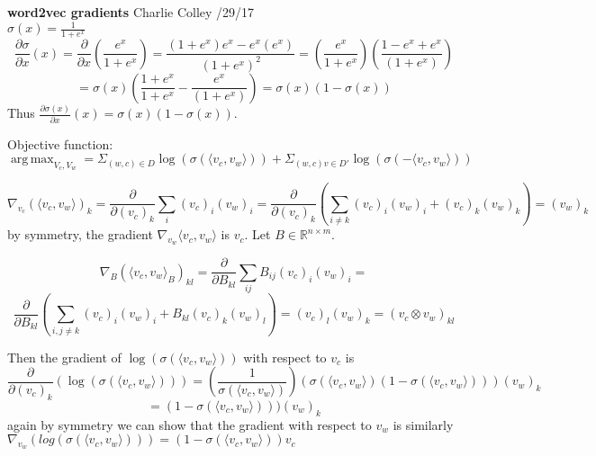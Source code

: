 \documentclass{report}
\DeclareMathOperator*{\argmax}{arg\,max}
\begin{document}
   \textbf{word2vec gradients} \quad Charlie Colley /29/17\\
   
     
   $ \sigma(x) = \frac{1}{1 + e^{x}} $
   \[\frac{\partial \sigma}{\partial x}(x) 
     =  \frac{\partial}{\partial x}(\frac{e^x}{1+e^x}) 
     =  \frac{(1 + e^x)e^x - e^x(e^x)}{(1 + e^x)^2} 
     = (\frac{e^x}{1+ e^x})(\frac{1 - e^x + e^x}{(1 + e^x)}) \]
     \[
     = \sigma(x)(\frac{1+e^x}{1+e^x} -\frac{e^x}{(1+e^x)})
     = \sigma(x)(1 - \sigma(x))
   \]
   Thus  $\frac{\partial \sigma(x)}{\partial x}(x) =
           \sigma(x)(1 - \sigma(x))$.
           
\vspace{10 mm}
   Objective function:\\
   $ \displaystyle\argmax_{V_c, V_w} 
     = \displaystyle\Sigma_{(w,c) \in D} 
     \log(\sigma(\langle v_c, v_w\rangle)) +\displaystyle\Sigma_{(w,c)v\in D'} 
         \log(\sigma(-\langle v_c, v_w \rangle)) $

   \[
      \nabla_{v_c} (\langle v_c, v_w \rangle)_k = \frac{\partial}{\partial (v_c)_k}\displaystyle \sum_{i}(v_c)_i(v_w)_i = \frac{\partial}{\partial (v_c)_k}(\displaystyle \sum_{i \neq k}(v_c)_i(v_w)_i + (v_c)_k(v_w)_k) = (v_w)_k
   \]
   by symmetry, the gradient $\nabla_{v_w} \langle v_c, v_w \rangle $ is $ v_c $.
   Let $ B \in \mathbb{R}^{n \times m}$.
     
    \[ \nabla_{B} (\langle v_c, v_w \rangle_{B})_{kl} = \frac{\partial}{\partial B_{kl}}\displaystyle \sum_{ij}B_{ij}(v_c)_i(v_w)_i = \]
    \[\frac{\partial}{\partial B_{kl}}(\displaystyle \sum_{i,j \neq k}(v_c)_i(v_w)_i + B_{kl}(v_c)_k(v_w)_l) = (v_c)_l(v_w)_k = (v_c \otimes v_w)_{kl}\]
    
    Then the gradient of $ \log(\sigma(\langle v_c, v_w \rangle )) $ with respect to $ v_c $ is 
    \[
      \frac{\partial}{\partial (v_c)_k}(\log(\sigma(\langle v_c, v_w \rangle)))
      = (\frac{1}{\sigma(\langle v_c, v_w \rangle)})(\sigma(\langle v_c, v_w \rangle)(1 - \sigma(\langle v_c, v_w \rangle)))(v_w)_k 
    \]
    \[
      = (1 - \sigma(\langle v_c, v_w \rangle)))(v_w)_k 
    \]
    again by symmetry we can show that the gradient with respect to $ v_w $ is similarly $ \nabla_{v_w}(log(\sigma(\langle v_c, v_w \rangle))) = (1 - \sigma(\langle v_c, v_w \rangle))v_c $
    
    

   
   \newpage
 
\end{document}
